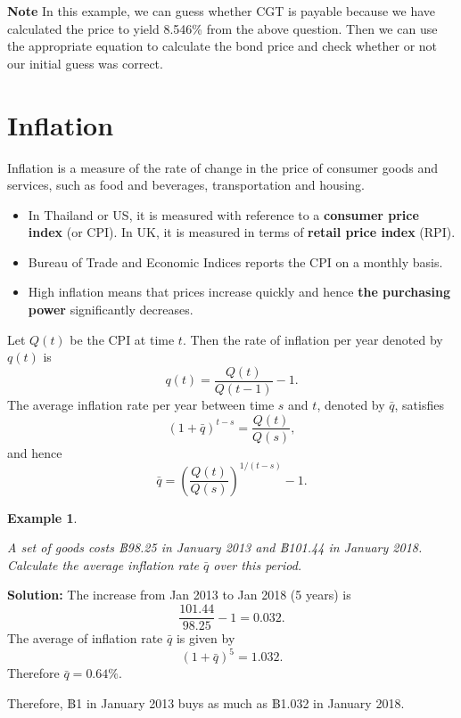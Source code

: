 \documentclass[landscape, 20pt]{extreport}
\theoremstyle{definition}
\theoremstyle{definition}
\newtheorem{example}{Example}[chapter]
\theoremstyle{definition}
\theoremstyle{definition}
\theoremstyle{remark}
\begin{document}
\textbf{Note} In this example, we can guess whether CGT is payable because we have calculated the price to yield 8.546\% from the above question. Then we can use the appropriate equation to calculate the bond price and check whether or not our initial guess was correct.

\hypertarget{inflation}{%
\section{Inflation}\label{inflation}}

Inflation is a measure of the rate of change in the price of consumer
goods and services, such as food and beverages, transportation and
housing.

\begin{itemize}
\item
  In Thailand or US, it is measured with reference to a \textbf{consumer
  price index} (or CPI). In UK, it is measured in terms of \textbf{retail
  price index} (RPI).
\item
  Bureau of Trade and Economic Indices reports the CPI on a monthly
  basis.
\item
  High inflation means that prices increase quickly and hence \textbf{the
  purchasing power} significantly decreases.
\end{itemize}

Let \(Q(t)\) be the CPI at time \(t\). Then the rate of inflation per year
denoted by \(q(t)\) is \[q(t) = \frac{Q(t)}{Q(t-1)} - 1.\] The average
inflation rate per year between time \(s\) and \(t\), denoted by \(\bar{q}\),
satisfies \[(1 + \bar{q})^{t-s} = \frac{Q(t)}{Q(s)},\] and hence
\[\bar{q} = \left( \frac{Q(t)}{Q(s)}  \right)^{1/(t-s)} - 1.\]

\newpage \begin{example}
\protect\hypertarget{exm:unlabeled-div-52}{}\label{exm:unlabeled-div-52}

\emph{A set of goods costs ฿98.25 in January 2013 and
฿101.44 in January 2018. Calculate the average inflation rate \(\bar{q}\)
over this period.}

\end{example}

\textbf{Solution:} The increase from Jan 2013 to Jan 2018 (5 years) is
\[\frac{101.44}{98.25}  - 1 =   0.032.\] The average of inflation rate
\(\bar{q}\) is given by \[(1  + \bar{q})^5 = 1.032.\] Therefore
\(\bar{q} = 0.64\%\).

Therefore, ฿1 in January 2013 buys as much as ฿1.032 in January 2018.
\end{document}

